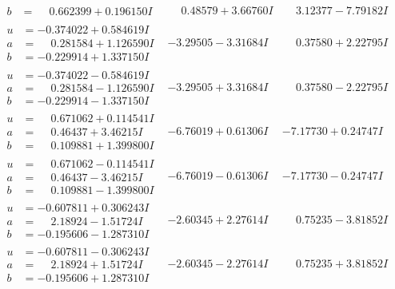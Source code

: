 \documentclass[1p]{elsarticle_modified}
\theoremstyle{definition}
\begin{document}
$$\begin{array}{c|c|c}
\begin{aligned}
b &= \phantom{-}0.662399 + 0.196150 I\end{aligned}
 & \phantom{-}0.48579 + 3.66760 I & \phantom{-}3.12377 - 7.79182 I \\ \hline\begin{aligned}
u &= -0.374022 + 0.584619 I \\
a &= \phantom{-}0.281584 + 1.126590 I \\
b &= -0.229914 + 1.337150 I\end{aligned}
 & -3.29505 - 3.31684 I & \phantom{-}0.37580 + 2.22795 I \\ \hline\begin{aligned}
u &= -0.374022 - 0.584619 I \\
a &= \phantom{-}0.281584 - 1.126590 I \\
b &= -0.229914 - 1.337150 I\end{aligned}
 & -3.29505 + 3.31684 I & \phantom{-}0.37580 - 2.22795 I \\ \hline\begin{aligned}
u &= \phantom{-}0.671062 + 0.114541 I \\
a &= \phantom{-}0.46437 + 3.46215 I \\
b &= \phantom{-}0.109881 + 1.399800 I\end{aligned}
 & -6.76019 + 0.61306 I & -7.17730 + 0.24747 I \\ \hline\begin{aligned}
u &= \phantom{-}0.671062 - 0.114541 I \\
a &= \phantom{-}0.46437 - 3.46215 I \\
b &= \phantom{-}0.109881 - 1.399800 I\end{aligned}
 & -6.76019 - 0.61306 I & -7.17730 - 0.24747 I \\ \hline\begin{aligned}
u &= -0.607811 + 0.306243 I \\
a &= \phantom{-}2.18924 - 1.51724 I \\
b &= -0.195606 - 1.287310 I\end{aligned}
 & -2.60345 + 2.27614 I & \phantom{-}0.75235 - 3.81852 I \\ \hline\begin{aligned}
u &= -0.607811 - 0.306243 I \\
a &= \phantom{-}2.18924 + 1.51724 I \\
b &= -0.195606 + 1.287310 I\end{aligned}
 & -2.60345 - 2.27614 I & \phantom{-}0.75235 + 3.81852 I \\ \hline\begin{aligned}

\end{aligned}
\end{array}$$
\end{document}

